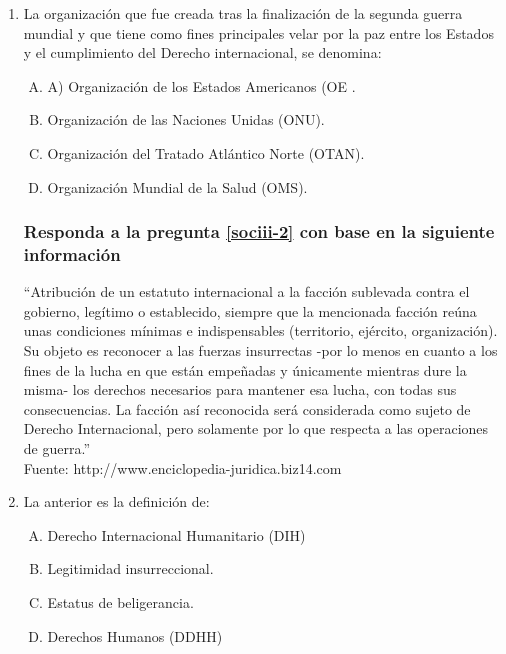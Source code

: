 \begin{enumerate}

\item La organización que fue creada tras la finalización de la segunda guerra mundial y que tiene como fines principales velar por la paz entre los Estados y el cumplimiento del Derecho internacional, se denomina:\label{sociii-1}


\begin{enumerate}[(A)]
\item A) Organización de los Estados Americanos (OE .
 \item  Organización de las Naciones Unidas (ONU).
\item Organización del Tratado Atlántico Norte (OTAN).
\item Organización Mundial de la Salud (OMS).
\end{enumerate}


\subsubsection*{Responda a la pregunta \ref{sociii-2} con base en la siguiente información}

``Atribución de un estatuto internacional a la facción sublevada contra el gobierno, legítimo o establecido, siempre que la mencionada facción reúna unas condiciones mínimas e indispensables (territorio, ejército, organización). Su objeto es reconocer a las fuerzas insurrectas -por lo menos en cuanto a los fines de la lucha en que están empeñadas y únicamente mientras dure la misma- los derechos necesarios para mantener esa lucha, con todas sus consecuencias. La facción así reconocida será considerada como sujeto de Derecho Internacional, pero solamente por lo que respecta a las operaciones de guerra.''
\\{\footnotesize Fuente: http://www.enciclopedia-juridica.biz14.com}


\item La anterior es la definición de:\label{sociii-2}


\begin{enumerate}[(A)]
\item   Derecho Internacional Humanitario (DIH)
 \item  Legitimidad insurreccional.
\item Estatus de beligerancia.
\item Derechos Humanos (DDHH)
\end{enumerate}



\end{enumerate}
